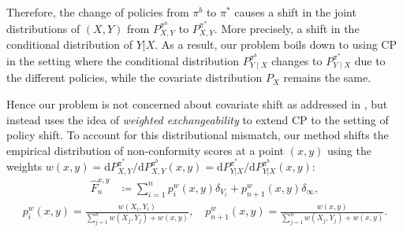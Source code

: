 Therefore, the change of policies from $\pi^b$ to $\pi^*$ causes a shift in the joint distributions of $(X, Y)$ from $P^{\pi^{b}}_{X, Y}$ to $P^{\pi^*}_{X, Y}$. More precisely, a shift in the conditional distribution of $Y|X$. As a result, our problem boils down to using CP in the setting where the conditional distribution $P^{\pi^{b}}_{Y\mid X}$ changes to $P^{\pi^{*}}_{Y \mid X}$ due to the different policies, while the covariate distribution $P_X$ remains the same. 

Hence our problem is not concerned about covariate shift as addressed in \cite{tibshirani2020conformal}, but instead uses the idea of \textit{weighted exchangeability} to extend CP to the setting of policy shift. To account for this distributional mismatch, our method shifts the empirical distribution of non-conformity scores at a point $(x, y)$ using the weights $w(x,y) = \mathrm{d}P^{\pi^{*}}_{X,Y}/\mathrm{d}P^{\pi^{b}}_{X,Y}(x,y) = \mathrm{d}P^{\pi^{*}}_{Y|X}/\mathrm{d}P^{\pi^{b}}_{Y|X}(x,y)$:
\begin{align}
   \textstyle  \hat{F}_{n}^{x, y} &\coloneqq \sum_{i=1}^n p_i^w(x, y)\delta_{V_i} + p_{n+1}^w(x,y)\delta_\infty, \label{score-dist-pshift}
\end{align}
\begin{align*}
p_i^{w}(x, y)= \frac{w(X_i, Y_i)}{\sum_{j=1}^n w(X_j, Y_j) + w(x, y)}, \quad
p_{n+1}^{w}(x, y) = \frac{w(x, y)}{\sum_{j=1}^n w(X_j, Y_j) + w(x, y)}. 
\end{align*}


